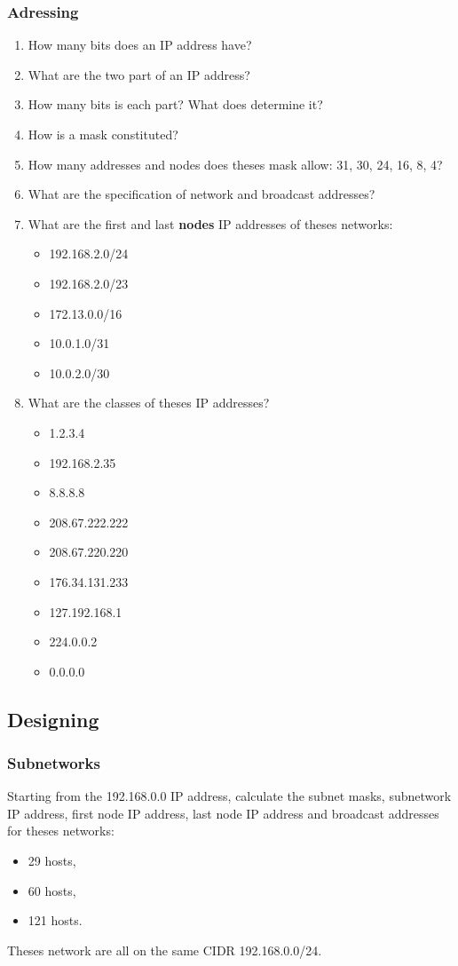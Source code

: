 \documentclass[11pt]{article}
\begin{document}
\subsubsection{Adressing}
\begin{enumerate}
  \item How many bits does an IP address have?
  \item What are the two part of an IP address?
  \item How many bits is each part? What does determine it?
  \item How is a mask constituted?
  \item How many addresses and nodes does theses mask allow: 31, 30, 24, 16, 8, 4?
  \item What are the specification of network and broadcast addresses?
  \item What are the first and last \textbf{nodes} IP addresses of theses networks:
    \begin{itemize}
      \item 192.168.2.0/24
      \item 192.168.2.0/23
      \item 172.13.0.0/16
      \item 10.0.1.0/31
      \item 10.0.2.0/30
    \end{itemize}
  \item What are the classes of theses IP addresses?
    \begin{itemize}
      \item 1.2.3.4
      \item 192.168.2.35
      \item 8.8.8.8
      \item 208.67.222.222
      \item 208.67.220.220
      \item 176.34.131.233
      \item 127.192.168.1
      \item 224.0.0.2
      \item 0.0.0.0
    \end{itemize}
\end{enumerate}

\subsection{Designing}
\subsubsection{Subnetworks}
Starting from the 192.168.0.0 IP address, calculate the subnet masks, subnetwork IP address, first node IP address, last node IP address and broadcast addresses for theses networks:
\begin{itemize}
  \item 29 hosts,
  \item 60 hosts,
  \item 121 hosts.
\end{itemize}
Theses network are all on the same CIDR 192.168.0.0/24.
\end{document}

